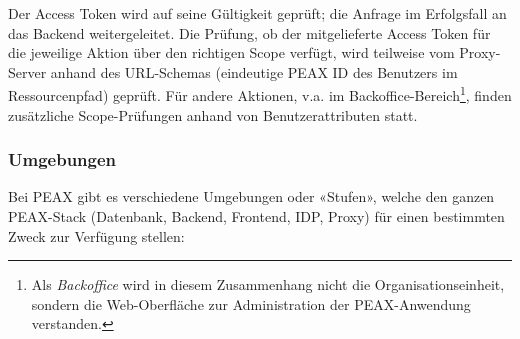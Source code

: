 Der Access Token wird auf seine Gültigkeit geprüft; die Anfrage im Erfolgsfall an das Backend weitergeleitet. Die Prüfung, ob der mitgelieferte Access Token für die jeweilige Aktion über den richtigen Scope verfügt, wird teilweise vom Proxy-Server anhand des URL-Schemas (eindeutige PEAX ID des Benutzers im Ressourcenpfad) geprüft. Für andere Aktionen, v.a. im Backoffice-Bereich\footnote{Als \textit{Backoffice} wird in diesem Zusammenhang nicht die Organisationseinheit, sondern die Web-Oberfläche zur Administration der PEAX-Anwendung verstanden.}, finden zusätzliche Scope-Prüfungen anhand von Benutzerattributen statt.

\subsubsection{Umgebungen}
\label{sec:Umgebungen}

Bei PEAX gibt es verschiedene Umgebungen oder «Stufen», welche den ganzen PEAX-Stack (Datenbank, Backend, Frontend, IDP, Proxy) für einen bestimmten Zweck zur Verfügung stellen:

